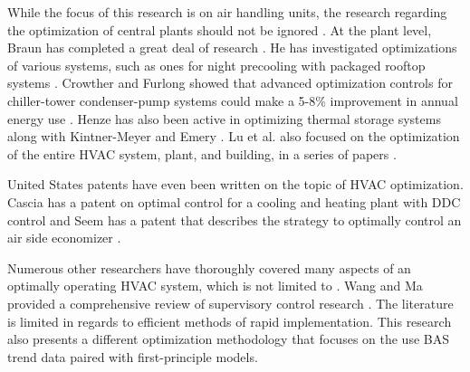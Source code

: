 While the focus of this research is on air handling units, the research
regarding the optimization of central plants should not be ignored
\cite{Ahn2001, Yu2008OptimizingChillers}. At the plant level, Braun has
completed a great deal of research \cite{braun1990, Braun2007RP1252,
Braun2007HybridCooling, Braun2007GeneralControl}. He has investigated
optimizations of various systems, such as ones for night precooling with packaged
rooftop systems \cite{Braun2005}. Crowther and Furlong showed that
advanced optimization controls for chiller-tower condenser-pump systems
could make a 5-8\% improvement in annual energy use
\cite{Crowther2004}. Henze has also been active in
optimizing thermal storage systems \cite{Henze2005} along with
Kintner-Meyer and Emery \cite{KintnerMeyer1995}. Lu et al. also focused
on the optimization of the entire HVAC system, plant, and building, in a
series of papers \cite{LuLu2004, LuLu2005Part1, LuLu2005Part2,
LuLu2005HVACSystemOptimization}. 

United States patents have even been written on the topic of HVAC
optimization. Cascia has a patent on optimal control for a cooling and
heating plant with DDC control \cite{Cascia1999} and Seem has a patent
that describes the strategy to optimally control an air side economizer
\cite{Seem2002}. 

Numerous other researchers have thoroughly covered many aspects of an
optimally operating HVAC system, which is not limited to
\cite{Gruber2014AlternativeBuildings,Cho2009Single-ductOptimization,Nassif2005,Zaheer-uddin2000OptimalBuildings,Wang2000Model-basedAlgorithm,Henze2003EvaluationSystems,Liu2006ExperimentalFoundation,
Zheng1996,
Ning2010Neuro-optimalSystem,Atthajariyakul2004,Cui2004,XuXinhua2009,SunZhongwei2011,Mumma1997EnergyControl,Mossolly-Ghali-Ghaddar_2009_Energy}.
Wang and Ma provided a comprehensive review of supervisory control
research \cite{Wang2008}. The literature is limited in regards to
efficient methods of rapid implementation. This research also presents a
different optimization methodology that focuses on the use BAS trend
data paired with first-principle models. 











